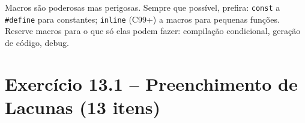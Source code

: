 \documentclass[12pt,a4paper]{article}
\begin{document}
\begin{boaprática}
  Macros são poderosas mas perigosas. Sempre que possível, prefira:
  \texttt{const} a \texttt{\#define} para constantes; \texttt{inline} (C99+) a
  macros para pequenas funções. Reserve macros para o que só elas podem fazer:
  compilação condicional, geração de código, debug.
\end{boaprática}

\tableofcontents\newpage

\section{Exercício 13.1 -- Preenchimento de Lacunas (13 itens)}
\end{document}
